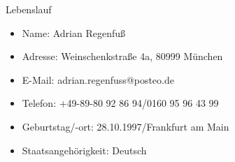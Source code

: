 \documentclass[11pt,a4paper]{article}
\begin{document}
\thispagestyle{empty}
\pagestyle{empty}

{\bf\centerline{{\huge Lebenslauf}}}
\vspace{15pt}

\begin{itemize}
\item[] Name: Adrian Regenfuß
\item[] Adresse: Weinschenkstraße 4a, 80999 München
\item[] E-Mail: adrian.regenfuss@posteo.de
\item[] Telefon: +49-89-80 92 86 94/0160 95 96 43 99
\item[] Geburtstag/-ort: 28.10.1997/Frankfurt am Main
\item[] Staatsangehörigkeit: Deutsch
\end{itemize}
\end{document}
